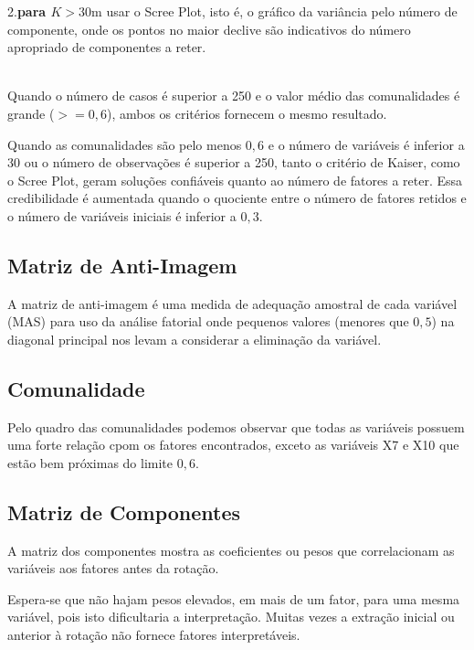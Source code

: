         2.\textbf{para $K > 30$}m usar o Scree Plot, isto é, o gráfico da variância pelo número de componente, onde os pontos no maior declive são indicativos do número apropriado de componentes a reter.
        
        \\
        
        Quando o número de casos é superior a 250 e o valor médio das comunalidades é grande ($>= 0,6$), ambos os critérios fornecem o mesmo resultado.
        
        Quando as comunalidades são pelo menos $0,6$ e o número de variáveis é inferior a 30 ou o número de observações é superior a 250, tanto o critério de Kaiser, como o Scree Plot, geram soluções confiáveis quanto ao número de fatores a reter. Essa credibilidade é aumentada quando o quociente entre o número de fatores retidos e o número de variáveis iniciais é inferior a $0,3$.
        
    \subsection{Matriz de Anti-Imagem}
    
        A matriz de anti-imagem é uma medida de adequação amostral de cada variável (MAS) para uso da análise fatorial onde pequenos valores (menores que $0,5$) na diagonal principal nos levam a considerar a eliminação da variável.
        
    \subsection{Comunalidade}
    
        Pelo quadro das comunalidades podemos observar que todas as variáveis possuem uma forte relação cpom os fatores encontrados, exceto as variáveis X7 e X10 que estão bem próximas do limite $0,6$.
        
    \subsection{Matriz de Componentes}
    
        A matriz dos componentes mostra as coeficientes ou pesos que correlacionam as variáveis aos fatores antes da rotação.
        
        Espera-se que não hajam pesos elevados, em mais de um fator, para uma mesma variável, pois isto dificultaria a interpretação. Muitas vezes a extração inicial ou anterior à rotação não fornece fatores interpretáveis.
        
